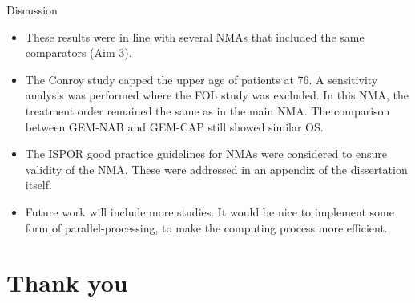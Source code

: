 \documentclass{beamer}
\begin{document}
\begin{frame}{Discussion}
    \begin{itemize}
        \item These results were in line with several NMAs that included the same comparators (Aim 3).
        \pause
        \item The Conroy study capped the upper age of patients at 76. A sensitivity analysis was performed where the FOL study was excluded. In this NMA, the treatment order remained the same as in the main NMA. The comparison between GEM-NAB and GEM-CAP still showed similar OS.
        \pause
        \item The ISPOR good practice guidelines for NMAs were considered to ensure validity of the NMA. These were addressed in an appendix of the dissertation itself.
        \pause
        \item Future work will include more studies. It would be nice to implement some form of parallel-processing, to make the computing process more efficient.
    \end{itemize}
\end{frame}

\section{Thank you}
\end{document}
